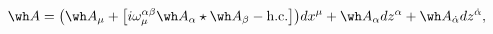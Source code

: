 \begin{equation}
\wh A = \big(\wh A_\mu + \big[
i\omega_\mu^{\alpha\beta} \wh A_\alpha \star \wh A_\beta
- \mbox{h.c.} \big] \big)dx^\mu + \wh A_\alpha dz^\alpha + 
\wh A_{\dot\alpha} dz^{\dot\alpha}, \label{eq:A}
\end{equation}

